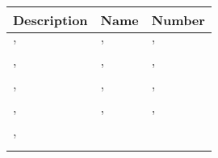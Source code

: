 \documentclass[]{article}
\theoremstyle{plain}
\theoremstyle{remark}
\theoremstyle{definition}
\begin{document}
\begin{longtable}[]{@{}lll@{}}
\toprule
\begin{minipage}[b]{0.41\columnwidth}\raggedright
Description\strut
\end{minipage} & \begin{minipage}[b]{0.28\columnwidth}\raggedright
Name\strut
\end{minipage} & \begin{minipage}[b]{0.11\columnwidth}\raggedright
Number\strut
\end{minipage}\tabularnewline
\midrule
\endhead
\begin{minipage}[t]{0.41\columnwidth}\raggedright
'\strut
\end{minipage} & \begin{minipage}[t]{0.28\columnwidth}\raggedright
'\strut
\end{minipage} & \begin{minipage}[t]{0.11\columnwidth}\raggedright
'\strut
\end{minipage}\tabularnewline
\begin{minipage}[t]{0.41\columnwidth}\raggedright
'\strut
\end{minipage} & \begin{minipage}[t]{0.28\columnwidth}\raggedright
'\strut
\end{minipage} & \begin{minipage}[t]{0.11\columnwidth}\raggedright
'\strut
\end{minipage}\tabularnewline
\begin{minipage}[t]{0.41\columnwidth}\raggedright
'\strut
\end{minipage} & \begin{minipage}[t]{0.28\columnwidth}\raggedright
'\strut
\end{minipage} & \begin{minipage}[t]{0.11\columnwidth}\raggedright
'\strut
\end{minipage}\tabularnewline
\begin{minipage}[t]{0.41\columnwidth}\raggedright
'\strut
\end{minipage} & \begin{minipage}[t]{0.28\columnwidth}\raggedright
'\strut
\end{minipage} & \begin{minipage}[t]{0.11\columnwidth}\raggedright
'\strut
\end{minipage}\tabularnewline
\begin{minipage}[t]{0.41\columnwidth}\raggedright
'\strut

\end{minipage}
\end{longtable}
\end{document}
